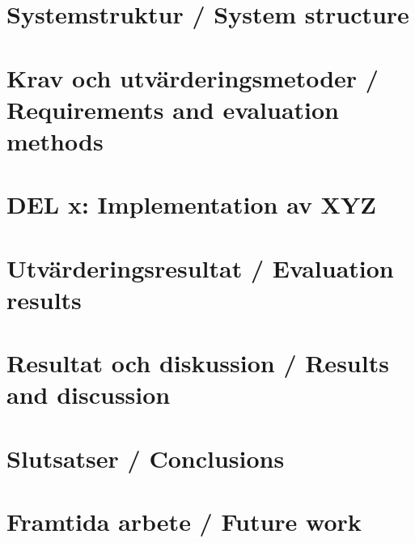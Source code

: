\documentclass[a4paper,12pt]{article}
\begin{document}
\section{Systemstruktur / System structure}


\section{Krav och utvärderingsmetoder / Requirements and evaluation methods}\label{sec:krav}


\section{DEL x: Implementation av XYZ}


\section{Utvärderingsresultat / Evaluation results}


\section{Resultat och diskussion / Results and discussion}


\section{Slutsatser / Conclusions}


\section{Framtida arbete / Future work}



%



%

\newpage
\appendix %

\end{document}
